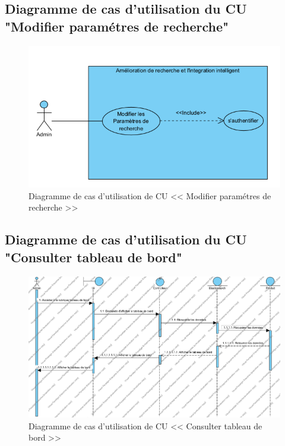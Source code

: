 \newpage
\subsection{Diagramme de cas d'utilisation du CU "Modifier paramétres de recherche"}
\begin{figure}[H]
	\centering
	\includegraphics[width=1\textwidth]{logos/cusprint3.png}
	\caption{Diagramme de cas d'utilisation de CU << Modifier paramétres de recherche >>}
	\label{fig:cusprint3}
\end{figure}

\subsection{Diagramme de cas d'utilisation du CU "Consulter tableau de bord"}
\begin{figure}[H]
	\centering
	\includegraphics[width=1\textwidth]{logos/consultertb.png}
	\caption{Diagramme de cas d'utilisation de CU << Consulter tableau de bord >>}
	\label{fig:consultertb}
\end{figure}



